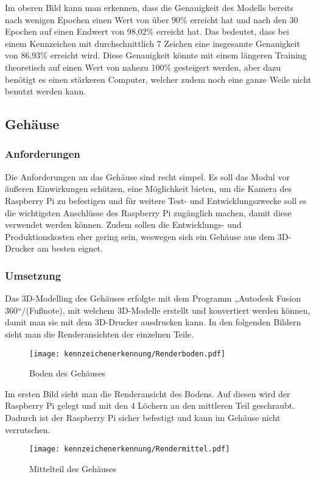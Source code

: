 Im oberen Bild kann man erkennen, dass die Genauigkeit des Modells bereits nach wenigen Epochen einen Wert von über 90\% erreicht hat und 
nach den 30 Epochen auf einen Endwert von 98,02\% erreicht hat. Das bedeutet, dass bei einem Kennzeichen mit durchschnittlich 7 Zeichen 
eine insgesamte Genauigkeit von 86,93\% erreicht wird. Diese Genauigkeit könnte mit einem längeren Training theoretisch auf einen Wert von 
nahezu 100\% gesteigert werden, aber dazu benötigt es einen stärkeren Computer, welcher zudem noch eine ganze Weile nicht benutzt werden kann.

\subsection{Gehäuse}

\subsubsection{Anforderungen}
Die Anforderungen an das Gehäuse sind recht simpel. Es soll das Modul vor äußeren Einwirkungen schützen, eine Möglichkeit bieten, 
um die Kamera des Raspberry Pi zu befestigen und für weitere Test- und Entwicklungszwecke soll es die wichtigsten Anschlüsse des Raspberry Pi 
zugänglich machen, damit diese verwendet werden können. Zudem sollen die Entwicklungs- und Produktionskosten eher gering sein, weswegen sich ein 
Gehäuse aus dem 3D-Drucker am besten eignet.

\subsubsection{Umsetzung}
Das 3D-Modelling des Gehäuses erfolgte mit dem Programm „Autodesk Fusion 360“/(Fußnote), mit welchem 3D-Modelle erstellt und konvertiert werden können, 
damit man sie mit dem 3D-Drucker ausdrucken kann. In den folgenden Bildern sieht man die Renderansichten der einzelnen Teile.

\begin{figure}[H]
    \centering
    \texttt{[image: kennzeichenerkennung/Renderboden.pdf]}
    \caption{Boden des Gehäuses}
\end{figure}

Im ersten Bild sieht man die Renderansicht des Bodens. Auf diesen wird der Raspberry Pi gelegt und mit den 4 Löchern an den mittleren Teil geschraubt. 
Dadurch ist der Raspberry Pi sicher befestigt und kann im Gehäuse nicht verrutschen.

\begin{figure}[H]
    \centering
    \texttt{[image: kennzeichenerkennung/Rendermittel.pdf]}
    \caption{Mittelteil des Gehäuses}
\end{figure}

